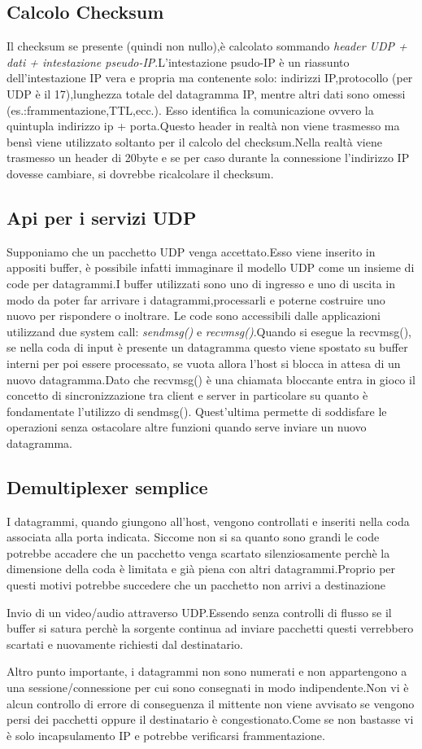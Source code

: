 \subsection{Calcolo Checksum}
Il checksum se presente (quindi non nullo),è calcolato sommando \textit{header UDP + dati + intestazione pseudo-IP}.L'intestazione psudo-IP è un riassunto dell'intestazione IP vera e propria ma contenente solo: indirizzi IP,protocollo (per UDP è il 17),lunghezza totale del datagramma IP, mentre altri dati sono omessi (es.:frammentazione,TTL,ecc.). Esso identifica la comunicazione ovvero la quintupla indirizzo ip + porta.Questo header in realtà non viene trasmesso ma bensì viene utilizzato soltanto per il calcolo del checksum.Nella realtà viene trasmesso un header di 20byte e se per caso durante la connessione l'indirizzo IP dovesse cambiare, si dovrebbe ricalcolare il checksum.
\subsection{Api per i servizi UDP}
Supponiamo che un pacchetto UDP venga accettato.Esso viene inserito in appositi buffer, è possibile infatti immaginare il modello UDP come un insieme di code per datagrammi.I buffer utilizzati sono uno di ingresso e uno di uscita in modo da poter far arrivare i datagrammi,processarli e poterne costruire uno nuovo per rispondere o inoltrare. Le code sono accessibili dalle applicazioni utilizzand due system call: \textit{sendmsg()} e \textit{recvmsg()}.Quando si esegue la recvmsg(), se nella coda di input è presente un datagramma questo viene spostato su buffer interni per poi essere processato, se vuota allora l'host si blocca in attesa di un nuovo datagramma.Dato che recvmsg() è una chiamata bloccante entra in gioco il concetto di sincronizzazione tra client e server in particolare su quanto è fondamentate l'utilizzo di sendmsg(). Quest'ultima permette di soddisfare le operazioni senza ostacolare altre funzioni quando serve inviare un nuovo datagramma.
\subsection{Demultiplexer semplice}
I datagrammi, quando giungono all'host, vengono controllati e inseriti nella coda associata alla porta indicata. Siccome non si sa quanto sono grandi le code potrebbe accadere che un pacchetto venga scartato silenziosamente perchè la dimensione della coda è limitata e già piena con altri datagrammi.Proprio per questi motivi potrebbe succedere che un pacchetto non arrivi a destinazione
\begin{example}
  Invio di un video/audio attraverso UDP.Essendo senza controlli di flusso se il buffer si satura perchè la sorgente continua ad inviare pacchetti questi verrebbero scartati e nuovamente richiesti dal destinatario.
\end{example}
Altro punto importante, i datagrammi non sono numerati e non appartengono a una sessione/connessione per cui sono consegnati in modo indipendente.Non vi è alcun controllo di errore di conseguenza il mittente non viene avvisato se vengono persi dei pacchetti oppure il destinatario è congestionato.Come se non bastasse vi è solo incapsulamento IP e potrebbe verificarsi frammentazione.
